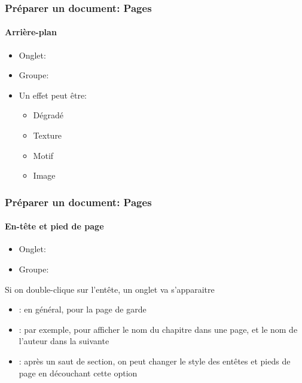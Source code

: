 \documentclass[xcolor=table]{beamer}
\begin{document}
\begin{frame}[t]
\frametitle{Préparer un document: Pages}
\framesubtitle{Arrière-plan}

\begin{minipage}{0.49\textwidth}
	\begin{itemize}
		\item Onglet: 
		\item Groupe: 
		\item Un effet peut être: 
		\begin{itemize}
			\item Dégradé
			\item Texture
			\item Motif
			\item Image
		\end{itemize}
	\end{itemize}
\end{minipage}
\begin{minipage}{0.50\textwidth}
\end{minipage}

\end{frame}



\begin{frame}
\frametitle{Préparer un document: Pages}
\framesubtitle{En-tête et pied de page}

\begin{minipage}{0.78\textwidth}
	\begin{itemize}
		\item Onglet:  
		\item Groupe: 
	\end{itemize}
\end{minipage}
\begin{minipage}{0.2\textwidth}
\end{minipage}

\vspace{6pt}
Si on double-clique sur l'entête, un onglet va s'apparaitre
\begin{itemize}
	\item {}: en général, pour la page de garde 
	\item {}: par exemple, pour afficher le nom du chapitre dans une page, et le nom de l'auteur dans la suivante
	\item {}: après un saut de section, on peut changer le style des entêtes et pieds de page en découchant cette option
\end{itemize}


\end{frame}
\end{document}
